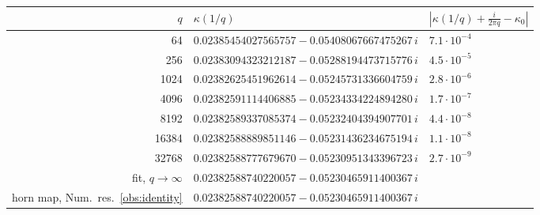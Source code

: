 \begin{tabular}{@{}rll@{}}
\toprule
$q$ & $\kappa(1/q)$ & $|\kappa(1/q)+\tfrac{i}{2\pi q}-\kappa_0|$ \\
\midrule
64 & $0.02385454027565757 - 0.05408067667475267\,i$ & $7.1\cdot10^{-4}$ \\
256 & $0.02383094323212187 - 0.05288194473715776\,i$ & $4.5\cdot10^{-5}$ \\
1024 & $0.02382625451962614 - 0.05245731336604759\,i$ & $2.8\cdot10^{-6}$ \\
4096 & $0.02382591114406885 - 0.05234334224894280\,i$ & $1.7\cdot10^{-7}$ \\
8192 & $0.02382589337085374 - 0.05232404394907701\,i$ & $4.4\cdot10^{-8}$ \\
16384 & $0.02382588889851146 - 0.05231436234675194\,i$ & $1.1\cdot10^{-8}$ \\
32768 & $0.02382588777679670 - 0.05230951343396723\,i$ & $2.7\cdot10^{-9}$ \\
\midrule
fit, $q\to\infty$ & $0.02382588740220057 - 0.05230465911400367\,i$ & \\
horn map, Num.~res.~\ref{obs:identity} & $0.02382588740220057 - 0.05230465911400367\,i$ & \\
\bottomrule
\end{tabular}
